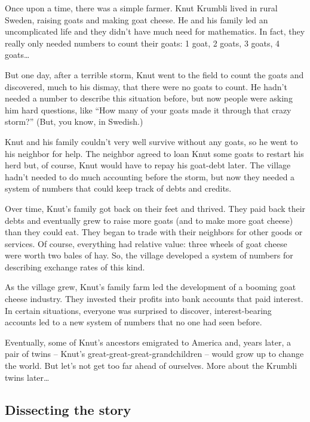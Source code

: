 \begin{story}
Once upon a time, there was a simple farmer. Knut Krumbli lived in rural Sweden, raising goats and making goat cheese. He and his family led an uncomplicated life and they didn't have much need for mathematics. In fact, they really only needed numbers to count their goats: 1 goat, 2 goats, 3 goats, 4 goats\ldots

But one day, after a terrible storm, Knut went to the field to count the goats and discovered, much to his dismay, that there were no goats to count. He hadn't needed a number to describe this situation before, but now people were asking him hard questions, like ``How many of your goats made it through that crazy storm?'' (But, you know, in Swedish.)

Knut and his family couldn't very well survive without any goats, so he went to his neighbor for help. The neighbor agreed to loan Knut some goats to restart his herd but, of course, Knut would have to repay his goat-debt later. The village hadn't needed to do much accounting before the storm, but now they needed a system of numbers that could keep track of debts and credits.

Over time, Knut's family got back on their feet and thrived. They paid back their debts and eventually grew to raise more goats (and to make more goat cheese) than they could eat. They began to trade with their neighbors for other goods or services. Of course, everything had relative value: three wheels of goat cheese were worth two bales of hay. So, the village developed a system of numbers for describing exchange rates of this kind.

As the village grew, Knut's family farm led the development of a booming goat cheese industry. They invested their profits into bank accounts that paid interest. In certain situations, everyone was surprised to discover, interest-bearing accounts led to a new system of numbers that no one had seen before.

Eventually, some of Knut's ancestors emigrated to America and, years later, a pair of twins -- Knut's great-great-great-grandchildren -- would grow up to change the world. But let's not get too far ahead of ourselves. More about the Krumbli twins later\ldots
\end{story}


\subsection{Dissecting the story}

